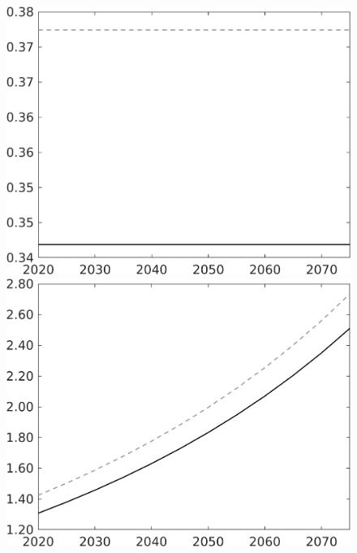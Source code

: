 \documentclass[12pt]{article}
\begin{document}
\begin{figure}[h!!]
\begin{minipage}[]{0.32\textwidth}
	\end{minipage}	
	\begin{minipage}[]{0.32\textwidth}
		\includegraphics[width=1\textwidth]{../../codding_model/own_basedOnFried/optimalPol_010922_revision/figures/all_13Sept22/CompTaul_LFBAU_Reg0_hh_spillover0_nsk1_xgr1_knspil0_sep1_countec0_GovRev0_etaa0.79_lgd0.png}
	\end{minipage}	
	\begin{minipage}[]{0.32\textwidth}
		\includegraphics[width=1\textwidth]{../../codding_model/own_basedOnFried/optimalPol_010922_revision/figures/all_13Sept22/CompTaul_LFBAU_Reg0_C_spillover0_nsk1_xgr1_knspil0_sep1_countec0_GovRev0_etaa0.79_lgd0.png}

\end{minipage}
\end{figure}
\end{document}
